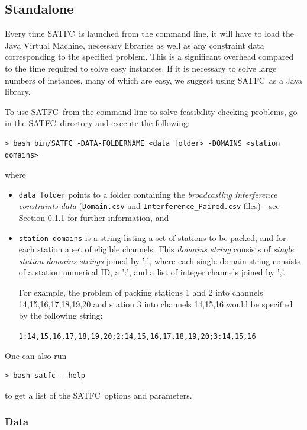\documentclass[
10pt, %
letterpaper, %
oneside, %
headinclude,footinclude, %
BCOR5mm, %
needspace, %
]{scrartcl}
\newcommand{\SATFC}{\textsc{SATFC}~}
\begin{document}
\subsection{Standalone}\label{sec:standalone}

\begin{fwarning}
Every time \SATFC is launched from the command line, it will have to load the Java Virtual Machine, necessary libraries as well as any constraint data corresponding to the specified problem. This is a significant overhead compared to the time required to solve easy instances. If it is necessary to solve large numbers of instances, many of which are easy, we suggest using \SATFC as a Java library.
\end{fwarning}

To use \SATFC from the command line to solve feasibility checking problems, go in the \SATFC directory and execute the following:
\begin{lstlisting}[style=Bash]
> bash bin/SATFC -DATA-FOLDERNAME <data folder> -DOMAINS <station domains>
\end{lstlisting}
where 
\begin{itemize}
\item \texttt{data folder} points to a folder containing the \emph{broadcasting interference constraints data} (\texttt{Domain.csv} and \texttt{Interference\_Paired.csv} files) - see Section \ref{sec:data} for further information, and
\item \texttt{station domains} is a string listing a set of stations to be packed, and for each station a set of eligible channels. This \emph{domains string} consists of \emph{single station domains strings} joined by ';', where each single domain string consists of a station numerical ID, a ':', and a list of integer channels joined by ','. 

For example, the problem of packing stations 1 and 2 into channels 14,15,16,17,18,19,20 and station 3 into channels 14,15,16 would be specified by the following string:
\begin{center}
\texttt{1:14,15,16,17,18,19,20;2:14,15,16,17,18,19,20;3:14,15,16}
\end{center}
\end{itemize}
One can also run
\begin{lstlisting}[style=Bash]
> bash satfc --help
\end{lstlisting}
to get a list of the \SATFC options and parameters.

\subsubsection{Data}\label{sec:data}
\end{document}
